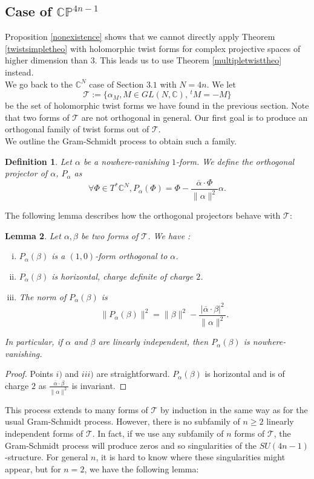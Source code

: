 \documentclass[12pt, reqno]{amsart}
\newtheorem{Def}{Definition}[subsection]
\newtheorem{lemma}[Def]{Lemma}
\newcommand{\C}{\mathbb{C}}
\newcommand{\p}{\mathbb{P}}
\begin{document}
\subsection{Case of $\C\p^{4n-1}$}
Proposition \ref{nonexistence} shows that we cannot directly apply Theorem \ref{twistsimpletheo} with holomorphic twist forms for complex projective spaces of higher dimension than $3$. This leads us to use Theorem \ref{multipletwisttheo} instead. \\ 
\indent We go back to the $\C^N$ case of Section $3.1$ with $N=4n$. We let \[\mathcal{T}:=\{\alpha_M, M\in GL(N,\C),\, {}^tM=-M\}\] be the set of holomorphic twist forms we have found in the previous section. Note that two forms of $\mathcal{T}$ are not orthogonal in general. Our first goal is to produce an orthogonal family of twist forms out of $\mathcal{T}$.\\ \indent We outline the Gram-Schmidt process to obtain such a family. 
\begin{Def}
    Let $\alpha$ be a nowhere-vanishing $1$-form. We define the orthogonal projector of $\alpha$, $P_\alpha$ as \[\forall\Phi\in T^*\C^N, P_\alpha(\Phi)=\Phi-\frac{\overline{\alpha}\cdot\Phi}{\|\alpha\|^2}\alpha.\] 
\end{Def}
The following lemma describes how the orthogonal projectors behave with $\mathcal{T}$: 
\begin{lemma}\label{gramschmidt}
    Let $\alpha,\beta$ be two forms of $\mathcal{T}$. We have :
    \begin{enumerate}[i)]
        \item $P_\alpha(\beta)$ is a $(1,0)$-form orthogonal to $\alpha$.
        \item $P_\alpha(\beta)$ is horizontal, charge definite of charge $2$.
        \item The norm of $P_\alpha(\beta)$ is \[\|P_\alpha(\beta)\|^2=\|\beta\|^2-\frac{|\overline{\alpha}\cdot\beta|^2}{\|\alpha\|^2}.\]
    \end{enumerate}
    In particular, if $\alpha$ and $\beta$ are linearly independent, then $P_\alpha(\beta)$ is nowhere-vanishing. 
\end{lemma}
\begin{proof}
    Points $i)$ and $iii)$ are straightforward. $P_\alpha(\beta)$ is horizontal and is of charge $2$ as $\frac{\overline{\alpha}\cdot\beta}{\|\alpha\|^2}$ is invariant.
\end{proof}
This process extends to many forms of $\mathcal{T}$ by induction in the same way as for the usual Gram-Schmidt process. However, there is no subfamily of $n\geq 2$ linearly independent forms of $\mathcal{T}$. In fact, if we use any subfamily of $n$ forms of $\mathcal{T}$, the Gram-Schmidt process will produce zeros and so singularities of the $SU(4n-1)$-structure. For general $n$, it is hard to know where these singularities might appear, but for $n=2$, we have the following lemma:
\end{document}
